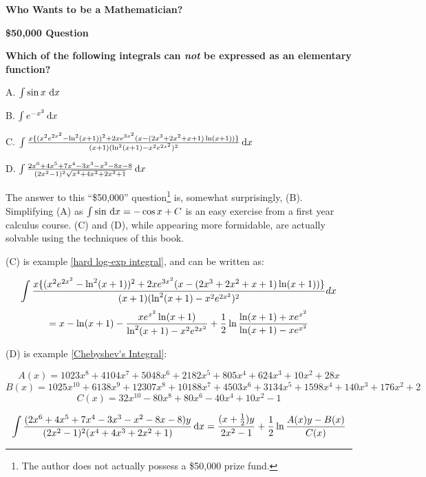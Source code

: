 

\vskip 0.5in

\centerline{\Huge\bf Who Wants to be a Mathematician?}

\vskip 0.5in
\centerline{\Huge\bf \$50,000 Question}

\vskip 0.5in
\begin{center}
{\LARGE\bf Which of the following integrals can {\it not} be expressed as an elementary function?}
\end{center}

\begin{center}
{\Huge A. $\int \sin x \, \,\mathrm{d} x$}

\vskip 12pt
{\Huge B. $\int e^{-x^2} \,\mathrm{d} x$}

\vskip 12pt
{\Huge C.}\,\,{\huge $\int{{x\{(x^2e^{2x^2}-\ln^2(x+1))^2+2xe^{3x^2}(x-(2x^3+2x^2+x+1)\ln(x+1))\}}\over{(x+1)(\ln^2(x+1) - x^2e^{2x^2})^2}} \,\mathrm{d} x$}

\vskip 12pt
{\Huge D. $\int {{2x^6+4x^5+7x^4-3x^3-x^2-8x-8}\over{(2x^2-1)^2\sqrt{x^4+4 x^3+2 x^2+1}}} \,\mathrm{d} x$}

\end{center}

\vfill\eject

The answer to this ``\$50,000'' question\footnote{The author does not actually possess
a \$50,000 prize fund.} is, somewhat surprisingly,
(B).  Simplifying (A) as $\int \sin \,\mathrm{d} x = -\cos x + C$ is an easy exercise from
a first year calculus course.  (C) and (D), while appearing
more formidable, are actually solvable using the
techniques of this book.

(C) is example
\ref{hard log-exp integral}, and can be written as:

$$\int{{x\{(x^2e^{2x^2}-\ln^2(x+1))^2+2xe^{3x^2}(x-(2x^3+2x^2+x+1)\ln(x+1))\}}\over{(x+1)(\ln^2(x+1) - x^2e^{2x^2})^2}} dx$$
$$= x - \ln(x+1) - {x e^{x^2}\ln(x+1)\over{\ln^2(x+1)-x^2 e^{2x^2}}}
+ {1\over2}\ln\frac{\ln(x+1) + x e^{x^2}}{\ln(x+1) - x e^{x^2}}$$

(D) is example \ref{Chebyshev's Integral}:

$$A(x) = 1023x^8+4104x^7+5048x^6+2182x^5+805x^4+624x^3+10x^2+28x$$
$$B(x) = 1025x^{10} + 6138x^9 + 12307x^8 + 10188x^7 + 4503x^6 + 3134x^5 + 1598x^4 + 140x^3 + 176x^2 +2$$
$$C(x) = 32x^{10}-80x^8+80x^6-40x^4+10x^2-1$$

$$\int {{(2x^6+4x^5+7x^4-3x^3-x^2-8x-8)y}\over{(2x^2-1)^2(x^4+4 x^3+2 x^2+1)}} \,{\rm d}x
= {{(x+{1\over2})y}\over{2x^2-1}} + {1\over2}\ln{{A(x)y - B(x)}\over{C(x)}}
$$

